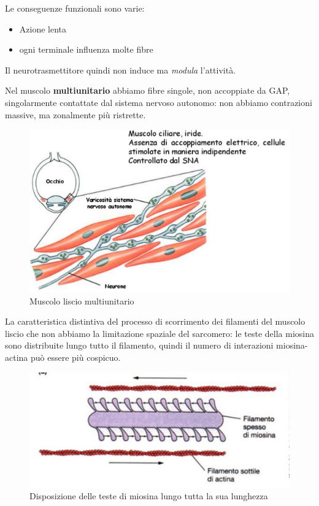 \documentclass[a4paper,12pt]{article}
\begin{document}
Le conseguenze funzionali sono varie:
\begin{itemize}
\item{Azione lenta}
\item{ogni terminale influenza molte fibre}
\end{itemize}

Il neurotrasmettitore quindi non induce ma \emph{modula} l'attività.

Nel muscolo \textbf{multiunitario} abbiamo fibre singole, non accoppiate da GAP, singolarmente contattate dal sistema nervoso autonomo: non abbiamo contrazioni massive, ma zonalmente più ristrette.
\begin{figure}[H]
\centering
\includegraphics[scale=0.4]{immagine/multiunitario.jpg}
\caption{Muscolo liscio multiunitario}
\end{figure}
La caratteristica distintiva del processo di scorrimento dei filamenti del muscolo liscio  che  non abbiamo la limitazione spaziale del sarcomero: le teste della miosina sono distribuite lungo tutto il filamento, quindi il numero di interazioni miosina-actina può essere più cospicuo. 
\begin{figure}[H]
\centering
\includegraphics[scale=0.4]{immagine/mio_liscio.jpg}
\caption{Disposizione delle teste di miosina lungo tutta la sua lunghezza}
\end{figure}
\end{document}
